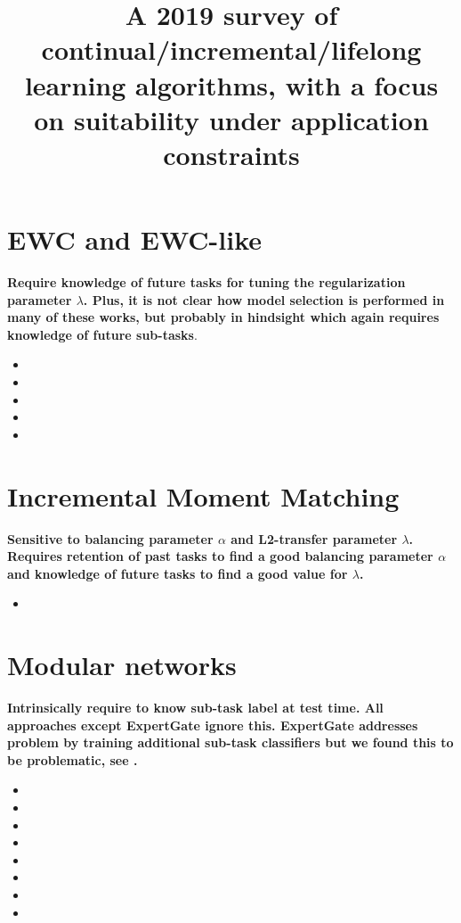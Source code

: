 \documentclass{article}
\title{A 2019 survey of continual/incremental/lifelong learning algorithms, with a focus on suitability under application constraints}
\begin{document}
\maketitle
\section{EWC and EWC-like}
\textbf{Require knowledge of future tasks for tuning the regularization parameter $\lambda$. Plus, it is not clear how model selection is performed in many of these works, but probably in hindsight which again requires knowledge of future sub-tasks}. 
\begin{itemize}
\item {}
\item {}
\item {}
\item {}
\item {}
\end{itemize}

\clearpage

\section{Incremental Moment Matching}
\textbf{Sensitive to balancing parameter $\alpha$ and L2-transfer parameter $\lambda$. Requires retention of past tasks to find a good balancing parameter $\alpha$ and knowledge of future tasks to find a good value for $\lambda$.}
\begin{itemize}
\item {}
\end{itemize}
%
\section{Modular networks}
\textbf{Intrinsically require to know sub-task label at test time. All approaches except ExpertGate \cite{aljundi2017expertGate} ignore this. ExpertGate addresses problem by training additional sub-task classifiers but we found this to be problematic, see \cite{gepperthincremental}.}
\begin{itemize}
\item {}
\item {}
\item {}
\item {}
\item {}
\item {}
\item {}
\item {}
\end{itemize}
\end{document}
